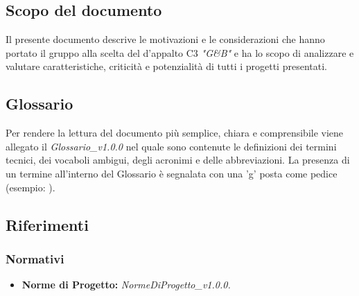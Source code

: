 	\subsection{Scopo del documento}
	Il presente documento descrive le motivazioni e le considerazioni che hanno portato il gruppo alla scelta del  d'appalto C3 \emph{"G\&B"} e ha lo scopo di analizzare e valutare caratteristiche, criticità e potenzialità di tutti i progetti presentati.
	\subsection{Glossario}
	Per rendere la lettura del documento più semplice, chiara e comprensibile viene allegato il \emph{Glossario\_v1.0.0} nel quale sono contenute le definizioni dei termini tecnici, dei vocaboli ambigui, degli acronimi e delle abbreviazioni. La presenza di un termine all'interno del Glossario è segnalata con una 'g' posta come pedice (esempio: ).  
	\subsection{Riferimenti}
		\subsubsection{Normativi}
		\begin{itemize}
			\item \textbf{Norme di Progetto:} \emph{NormeDiProgetto\_v1.0.0.}
		\end{itemize}
